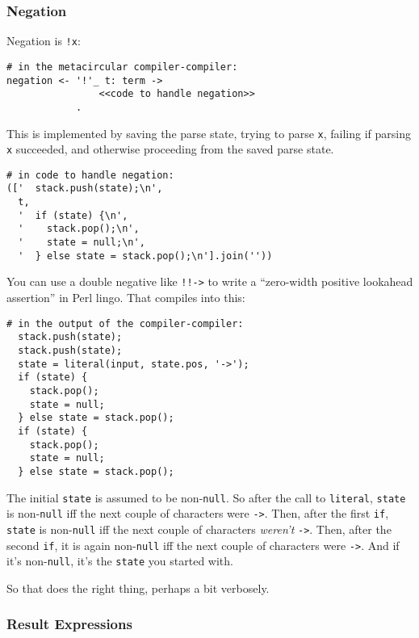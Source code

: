 \documentclass[
]{article}
\begin{document}
\hypertarget{negation}{%
\subsubsection{Negation}\label{negation}}

Negation is \texttt{!x}:

\begin{verbatim}
# in the metacircular compiler-compiler:
negation <- '!'_ t: term ->
                <<code to handle negation>>
            .
\end{verbatim}

This is implemented by saving the parse state, trying to parse
\texttt{x}, failing if parsing \texttt{x} succeeded, and otherwise
proceeding from the saved parse state.

\begin{verbatim}
# in code to handle negation:
(['  stack.push(state);\n',
  t,
  '  if (state) {\n',
  '    stack.pop();\n',
  '    state = null;\n',
  '  } else state = stack.pop();\n'].join(''))
\end{verbatim}

You can use a double negative like
\texttt{!!\textquotesingle{}-\textgreater{}\textquotesingle{}} to write
a ``zero-width positive lookahead assertion'' in Perl lingo. That
compiles into this:

\begin{verbatim}
# in the output of the compiler-compiler:
  stack.push(state);
  stack.push(state);
  state = literal(input, state.pos, '->');
  if (state) {
    stack.pop();
    state = null;
  } else state = stack.pop();
  if (state) {
    stack.pop();
    state = null;
  } else state = stack.pop();
\end{verbatim}

The initial \texttt{state} is assumed to be non-\texttt{null}. So after
the call to \texttt{literal}, \texttt{state} is non-\texttt{null} iff
the next couple of characters were \texttt{-\textgreater{}}. Then, after
the first \texttt{if}, \texttt{state} is non-\texttt{null} iff the next
couple of characters \emph{weren't} \texttt{-\textgreater{}}. Then,
after the second \texttt{if}, it is again non-\texttt{null} iff the next
couple of characters were \texttt{-\textgreater{}}. And if it's
non-\texttt{null}, it's the \texttt{state} you started with.

So that does the right thing, perhaps a bit verbosely.

\hypertarget{result-expressions}{%
\subsubsection{Result Expressions}\label{result-expressions}}
\end{document}
